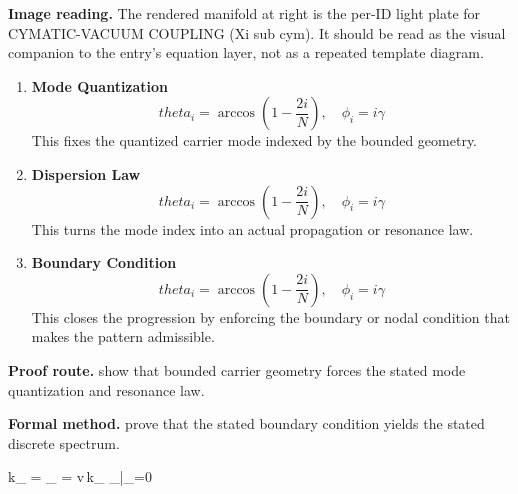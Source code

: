 \begin{samepage}
\noindent\begin{minipage}[t]{0.45\linewidth}
\vspace{0pt}
\raggedright
\scriptsize\textbf{Image reading.} The rendered manifold at right is the per-ID light plate for CYMATIC-VACUUM COUPLING (Xi sub cym). It should be read as the visual companion to the entry's equation layer, not as a repeated template diagram.\par
\end{minipage}\hfill
\begin{minipage}[t]{0.53\linewidth}
\vspace*{-0.10in}
\raggedright
{}
\end{minipage}
\end{samepage}

\clearpage


\begin{enumerate}[leftmargin=1.6em,itemsep=9pt,topsep=6pt]
\item \textbf{Mode Quantization}
\[
theta_i = \arccos(1 - \frac{2i}{N}), \quad \phi_i = i\gamma
\]
This fixes the quantized carrier mode indexed by the bounded geometry.

\item \textbf{Dispersion Law}
\[
theta_i = \arccos(1 - \frac{2i}{N}), \quad \phi_i = i\gamma
\]
This turns the mode index into an actual propagation or resonance law.

\item \textbf{Boundary Condition}
\[
theta_i = \arccos(1 - \frac{2i}{N}), \quad \phi_i = i\gamma
\]
This closes the progression by enforcing the boundary or nodal condition that makes the pattern admissible.
\end{enumerate}

\textbf{Proof route.} show that bounded carrier geometry forces the stated mode quantization and resonance law.

\textbf{Formal method.} prove that the stated boundary condition yields the stated discrete spectrum.

\medskip
{}

\begin{tzpsnapshot}
\end{tzpsnapshot}

\tzpequationlinks
  {k_{} = }
  {\omega_{} = v\,k_{}}
  {\Phi_{}|_{\partial\Omega}=0}
